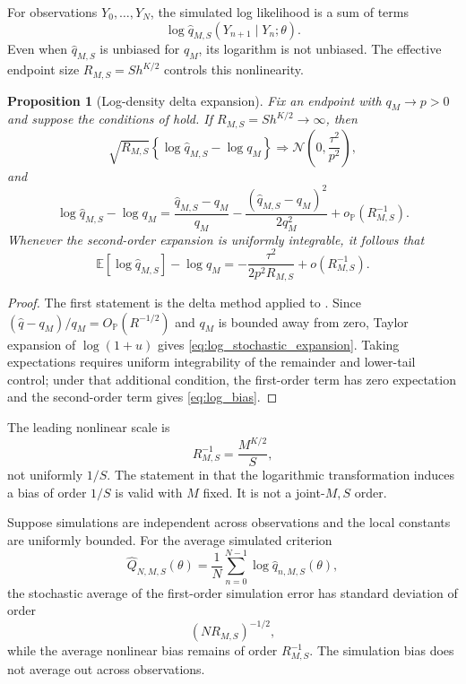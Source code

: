 \documentclass[11pt]{article}
\newtheorem{proposition}{Proposition}
\theoremstyle{definition}
\newcommand{\E}{\mathbb{E}}
\newcommand{\Pp}{\mathbb{P}}
\newcommand{\op}{o_{\Pp}}
\newcommand{\Op}{O_{\Pp}}
\newcommand{\Normal}{\mathcal{N}}
\begin{document}
For observations $Y_0,\ldots,Y_N$, the simulated log likelihood is a sum of terms
\[
\log\widehat q_{M,S}(Y_{n+1}\mid Y_n;\theta).
\]
Even when $\widehat q_{M,S}$ is unbiased for $q_M$, its logarithm is not unbiased. The effective endpoint size $R_{M,S}=S h^{K/2}$ controls this nonlinearity.

\begin{proposition}[Log-density delta expansion]\label{prop:log_delta}
Fix an endpoint with $q_M\to p>0$ and suppose the conditions of  hold. If $R_{M,S}=S h^{K/2}\to\infty$, then
\begin{equation}\label{eq:log_clt}
\sqrt{R_{M,S}}
\left\{\log\widehat q_{M,S}-\log q_M\right\}
\Longrightarrow
\Normal\!\left(0,\frac{\tau^2}{p^2}\right),
\end{equation}
and
\begin{equation}\label{eq:log_stochastic_expansion}
\log\widehat q_{M,S}-\log q_M
=
\frac{\widehat q_{M,S}-q_M}{q_M}
-\frac{(\widehat q_{M,S}-q_M)^2}{2q_M^2}
+\op(R_{M,S}^{-1}).
\end{equation}
Whenever the second-order expansion is uniformly integrable, it follows that
\begin{equation}\label{eq:log_bias}
\E[\log\widehat q_{M,S}]-\log q_M
=-\frac{\tau^2}{2p^2R_{M,S}}+o(R_{M,S}^{-1}).
\end{equation}
\end{proposition}

\begin{proof}
The first statement is the delta method applied to . Since $(\widehat q-q_M)/q_M=\Op(R^{-1/2})$ and $q_M$ is bounded away from zero, Taylor expansion of $\log(1+u)$ gives \eqref{eq:log_stochastic_expansion}. Taking expectations requires uniform integrability of the remainder and lower-tail control; under that additional condition, the first-order term has zero expectation and the second-order term gives \eqref{eq:log_bias}.
\end{proof}

The leading nonlinear scale is
\begin{equation}\label{eq:log_bias_order}
R_{M,S}^{-1}=\frac{M^{K/2}}{S},
\end{equation}
not uniformly $1/S$. The statement in \citet[p.~171]{BrandtSantaClara2002} that the logarithmic transformation induces a bias of order $1/S$ is valid with $M$ fixed. It is not a joint-$M,S$ order.

Suppose simulations are independent across observations and the local constants are uniformly bounded. For the average simulated criterion
\[
\widehat Q_{N,M,S}(\theta)
=\frac1N\sum_{n=0}^{N-1}
\log\widehat q_{n,M,S}(\theta),
\]
the stochastic average of the first-order simulation error has standard deviation of order
\[
(NR_{M,S})^{-1/2},
\]
while the average nonlinear bias remains of order $R_{M,S}^{-1}$. The simulation bias does not average out across observations.
\end{document}
